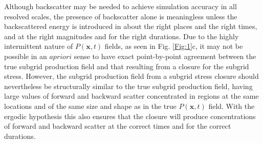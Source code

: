 Although backscatter may be needed to achieve simulation accuracy in all resolved scales, the presence of backscatter alone is meaningless unless the backscattered energy is introduced in about the right places and the right times, and at the right magnitudes and for the right durations. Due to the highly intermittent nature of  $P(\mathbf{x},t)$  fields, as seen in Fig. \ref{Fig:1}c, it may not be possible in an $a priori$ sense to have exact point-by-point agreement between the true subgrid production field and that resulting from a closure for the subgrid stress. However, the subgrid production field from a subgrid stress closure should nevertheless be structurally similar to the true subgrid production field, having large values of forward and backward scatter concentrated in regions at the same locations and of the same size and shape as in the true  $P(\mathbf{x},t)$  field. With the ergodic hypothesis this also ensures that the closure will produce concentrations of forward and backward scatter at the correct times and for the correct durations.

